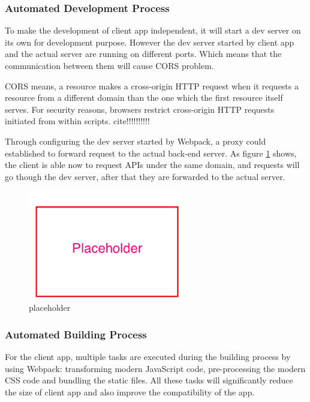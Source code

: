 \subsubsection{Automated Development Process}
To make the development of client app independent, it will start a dev server on its own for development purpose. However the dev server started by client app and the actual server are running on different ports. Which means that the communication between them will cause CORS problem.

CORS means, a resource makes a cross-origin HTTP request when it requests a resource from a different domain than the one which the first resource itself serves. For security reasons, browsers restrict cross-origin HTTP requests initiated from within scripts. cite!!!!!!!!!!

Through configuring the dev server started by Webpack, a proxy could established to forward request to the actual back-end server. As figure \ref{fig:proxy-server-imp} shows, the client is able now to request APIs under the same domain, and requests will go though the dev server, after that they are forwarded to the actual server.

\begin{figure}[!htbp]
  \centering
    \includegraphics[width=0.6\textwidth]{Figures/placeholder.png}
  \caption{placeholder}
  \label{fig:proxy-server-imp}
\end{figure}


\subsubsection{Automated Building Process}

For the client app, multiple tasks are executed during the building process by using Webpack: transforming modern JavaScript code, pre-processing the modern CSS code and bundling the static files. All these tasks will significantly reduce the size of client app and also improve the compatibility of the app.

